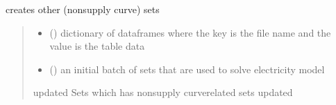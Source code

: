 \documentclass[letterpaper,10pt,english]{sphinxmanual}
\begin{document}
\begin{fulllineitems}
\label{\detokenize{src.models.electricity.scripts.preprocessor:src.models.electricity.scripts.preprocessor.create_other_sets}}
\pysigstartsignatures
\pysiglinewithargsret
{}
{\sphinxparamcomma {}}
{}
\pysigstopsignatures
\sphinxAtStartPar
creates other (non\sphinxhyphen{}supply curve) sets
\begin{quote}\begin{description}
\begin{itemize}
\item {} 
\sphinxAtStartPar
{} () \textendash{} dictionary of dataframes where the key is the file name and the value is the table data

\item {} 
\sphinxAtStartPar
{} ({\hyperref[\detokenize{src.models.electricity.scripts.preprocessor:src.models.electricity.scripts.preprocessor.Sets}]{}}) \textendash{} an initial batch of sets that are used to solve electricity model

\end{itemize}

\sphinxAtStartPar
updated Sets which has non\sphinxhyphen{}supply curve\sphinxhyphen{}related sets updated

\sphinxAtStartPar
{\hyperref[\detokenize{src.models.electricity.scripts.preprocessor:src.models.electricity.scripts.preprocessor.Sets}]{}}

\end{description}\end{quote}

\end{fulllineitems}

\end{document}
